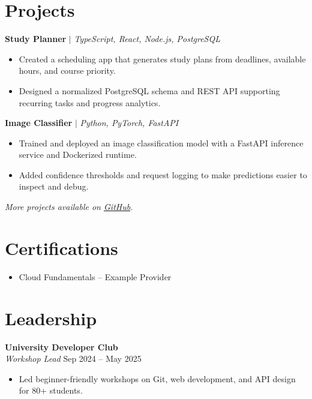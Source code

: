 \documentclass[11pt, a4paper]{article}
\begin{document}
\section*{Projects}
\noindent
\textbf{Study Planner} $|$ \textit{TypeScript, React, Node.js, PostgreSQL}
\begin{itemize}
    \item Created a scheduling app that generates study plans from deadlines, available hours, and course priority.
    \item Designed a normalized PostgreSQL schema and REST API supporting recurring tasks and progress analytics.
\end{itemize}

\noindent
\textbf{Image Classifier} $|$ \textit{Python, PyTorch, FastAPI}
\begin{itemize}
    \item Trained and deployed an image classification model with a FastAPI inference service and Dockerized runtime.
    \item Added confidence thresholds and request logging to make predictions easier to inspect and debug.
\end{itemize}

\vspace{0.05cm}
\noindent
\textit{\small More projects available on \href{https://github.com/example}{GitHub}.}

\section*{Certifications}
\begin{itemize}
    \item Cloud Fundamentals -- Example Provider
\end{itemize}

\section*{Leadership}
\noindent
\textbf{University Developer Club} \\
\textit{Workshop Lead} \hfill Sep 2024 -- May 2025
\begin{itemize}
    \item Led beginner-friendly workshops on Git, web development, and API design for 80+ students.
\end{itemize}
\end{document}
